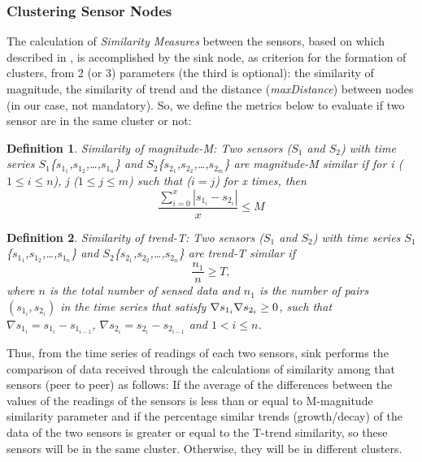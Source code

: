 \documentclass[conference]{IEEEtran}
\begin{document}
\subsubsection{Clustering Sensor Nodes}

The calculation of \textit{Similarity Measures} between the sensors, based on
which described in \cite{Liu2007}, is accomplished by the sink node, as
criterion for the formation of clusters, from 2 (or 3) parameters (the third is
optional):
the similarity of magnitude, the similarity of trend and the distance
(\textit{maxDistance}) between nodes (in our case, not mandatory). So, we define
the metrics below to evaluate if two sensor are in the same cluster or not:

\newtheorem{defini}{Definition}

\begin{defini}
Similarity of magnitude-M: Two sensors ($S_{1}$ and $S_{2}$) with time series
$S_{1}$\{$s_{1_1}$,$s_{1_2}$,\ldots,$s_{1_n}$\} and
$S_{2}$\{$s_{2_1}$,$s_{2_2}$,\ldots,$s_{2_m}$\} are magnitude-M similar if for
{\it i} ($1\leq i\leq n$), {\it j} ($1\leq j\leq m$) such that ($i = j$) for x times,
then 
\begin{equation}
\frac{\sum_{i = 0}^{x} |s_{1_i}-s_{2_i}|}{x} \leq M
\end{equation}
\end{defini}

\begin{defini}
Similarity of trend-T: Two sensors ($S_{1}$ and $S_{2}$) with time series
$S_{1}$\{$s_{1_1}$,$s_{1_2}$,\ldots,$s_{1_n}$\} and
$S_{2}$\{$s_{2_1}$,$s_{2_2}$,\ldots,$s_{2_n}$\} are trend-T similar if 
\begin{equation}
\frac{n_{1}}{n} \geq T,
\end{equation}
where $n$ is the total number of sensed data and $n_{1}$ is the number of pairs
$(s_{1_i},s_{2_i})$ in the time series that satisfy $\nabla s_{1_i} \* \nabla
s_{2_i} \geq 0$, such that $\nabla s_{1_i} = s_{1_i} - s_{1_{i-1}}$, $\nabla
s_{2_i} = s_{2_i} - s_{2_{i-1}}$ and $1 < i \leq n$.
\end{defini}

Thus, from the time series of readings of each two sensors, sink performs the
comparison of data received through the calculations of similarity among that
sensors (peer to peer) as follows:
If the average of the differences between the values of the readings of the
sensors is less than or equal to M-magnitude similarity parameter and if the
percentage similar trends (growth/decay) of the data of the two sensors is
greater or equal to the T-trend similarity, so these sensors will be in the same
cluster. Otherwise, they will be in different clusters.
\end{document}
